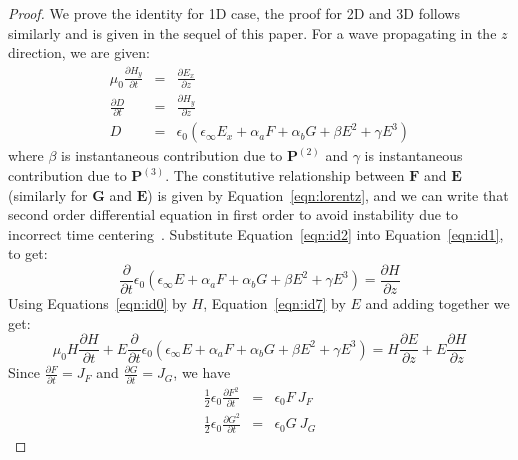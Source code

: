 \documentclass{article}[12pt]
\theoremstyle{plain}
\begin{document}
\begin{proof}
We prove the identity for 1D case, the proof for 2D and 3D follows similarly and is given
in the sequel of this paper. For a wave propagating in the $z$ direction, we are given:
\begin{eqnarray}
\mu_0 \frac{\partial H_y}{\partial t} & = & \frac{\partial E_x}{\partial z} \label{eqn:id0} \\
\frac{\partial D}{\partial t} & = & \frac{\partial H_y}{\partial z} \label{eqn:id1} \\
D & = & \epsilon_0(\epsilon_\infty E_x + \alpha_a F + \alpha_b G + \beta E^2 + \gamma E^3) \label{eqn:id2}
\end{eqnarray}
where $\beta$ is instantaneous contribution due to $\mathbf{P}^{(2)}$ and 
$\gamma$ is instantaneous contribution due to $\mathbf{P}^{(3)}$.
The constitutive relationship between $\mathbf{F}$ and $\mathbf{E}$ (similarly for
$\mathbf{G}$ and $\mathbf{E}$) is given by Equation~\ref{eqn:lorentz}, and we can write that 
second order differential equation in first order to avoid instability due to incorrect
time centering~\cite{gilles2000comparison}.
Substitute Equation~\ref{eqn:id2} into Equation~\ref{eqn:id1}, to get:
\begin{equation}
\frac{\partial}{\partial t} \epsilon_0 ( \epsilon_\infty E + \alpha_a F + \alpha_b G + \beta E^2 + \gamma E^3) = 
\frac{\partial H}{\partial z} \label{eqn:id7}
\end{equation}
Using Equations~\ref{eqn:id0} by $H$, Equation~\ref{eqn:id7} by $E$ and adding together we get:
\begin{equation}
\mu_0 H \frac{\partial H}{\partial t} + E \frac{\partial}{\partial t} \epsilon_0 ( \epsilon_\infty E + \alpha_a F + \alpha_b G + \beta E^2 + \gamma E^3) = H \frac{\partial E}{\partial z} + E \frac{\partial H}{\partial z} 
\label{eqn:id8}
\end{equation}
Since $\frac{\partial F}{\partial t} = J_F$ and $\frac{\partial G}{\partial t} = J_G$, we have 
\begin{eqnarray}
\frac{1}{2}\epsilon_0 \frac{\partial F^2}{\partial t} & = & \epsilon_0 F\ J_F \label{eqn:id7b} \\
\frac{1}{2}\epsilon_0 \frac{\partial G^2}{\partial t} & = & \epsilon_0 G\ J_G \label{eqn:id7c} 
\end{eqnarray}


\end{proof}
\end{document}
